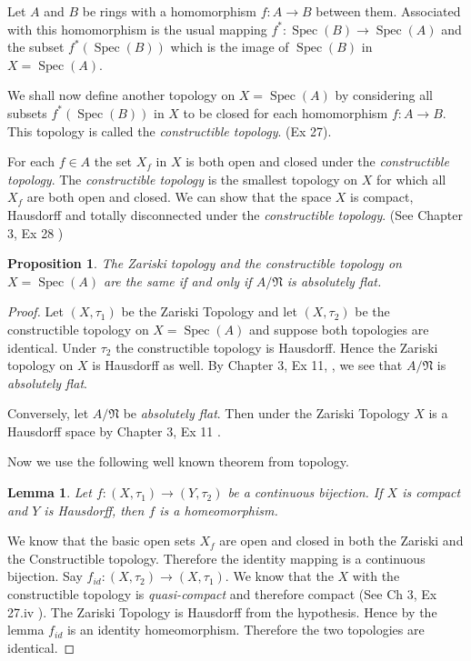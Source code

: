 \documentclass[]{report}
\newtheorem{prop}[theorem]{Proposition}
\newtheorem{lemma}[theorem]{Lemma}
\DeclareMathOperator\Spec{Spec}
\newcommand\mfk[1]{\mathfrak{#1}}
\begin{document}
Let $A$ and $B$ be rings with a homomorphism $f: A \rightarrow B$ between them. Associated with this homomorphism is the usual mapping $f^*: \Spec(B) \rightarrow \Spec(A)$ and the subset $f^*(\Spec(B))$ which is the image of $\Spec(B)$ in $X = \Spec(A)$.

We shall now define another topology on $X = \Spec(A)$ by considering all subsets $f^*(\Spec(B))$ in $X$ to be closed for each homomorphism $f: A \rightarrow B$. This topology is called the \textit{constructible topology}. (Ex 27).

For each $f \in A$ the set $X_f$ in $X$ is both open and closed under the \textit{constructible topology}. The \textit{constructible topology} is the smallest topology on $X$ for which all $X_f$ are both open and closed. We can show that the space $X$ is compact, Hausdorff and totally disconnected under the \textit{constructible topology}. (See Chapter 3, Ex 28 \cite{atiyah1})

\begin{prop}
    The Zariski topology and the constructible topology on $X = \Spec(A)$ are the same if and only if $A/\mfk{N}$ is \textit{absolutely flat}.
\end{prop}

\begin{proof}
    Let $(X,\tau_1)$ be the Zariski Topology and let $(X, \tau_2)$ be the constructible topology on $X = \Spec(A)$ and suppose both topologies are identical. Under $\tau_2$ the constructible topology is Hausdorff. Hence the Zariski topology on $X$ is Hausdorff as well. By Chapter 3, Ex 11, \cite{atiyah1}, we see that $A/\mathfrak{N}$ is \textit{absolutely flat}.

    Conversely, let $A/\mathfrak{N}$ be \textit{absolutely flat}. Then under the Zariski Topology $X$ is a Hausdorff space by Chapter 3, Ex 11 \cite{atiyah1}.

    Now we use the following well known theorem from topology.
    \begin{lemma}
        Let $f: (X, \tau_1) \rightarrow (Y, \tau_2)$ be a continuous bijection. If $X$ is compact and $Y$ is Hausdorff, then $f$ is a homeomorphism.
    \end{lemma}

    We know that the basic open sets $X_f$ are open and closed in both the Zariski and the Constructible topology. Therefore the identity mapping is a continuous bijection. Say $f_{id}: (X,\tau_2) \rightarrow (X, \tau_1)$. We know that the $X$ with the constructible topology is \textit{quasi-compact} and therefore compact (See Ch 3, Ex 27.iv \cite{atiyah1}). The Zariski Topology is Hausdorff from the hypothesis. Hence by the lemma $f_{id}$ is an identity homeomorphism. Therefore the two topologies are identical.
\end{proof}
\end{document}
